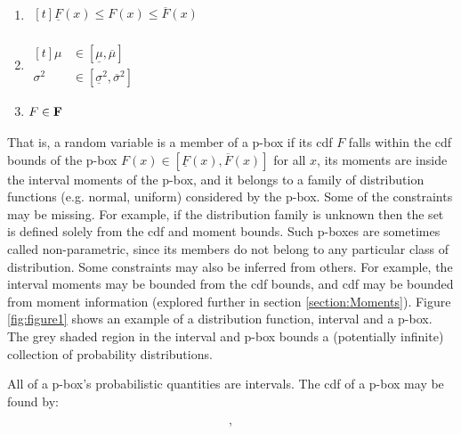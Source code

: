 \documentclass{juliacon}
\begin{document}
\begin{enumerate}
  \item $\begin{aligned}[t]
    \underline{F}(x) \leq F(x) \leq \overline{F}(x) \\%
  \end{aligned}$
  \item $\begin{aligned}[t]
    \mu &\in [\underline{ \mu }, \overline{ \mu }]  \\%
    \sigma^2 &\in [\underline{\sigma}^2 , \overline{\sigma}^2]
  \end{aligned}$
  \item $\begin{aligned}[t]
      F \in \bold{F} \\%
  \end{aligned}$
  \end{enumerate}

\noindent That is, a random variable is a member of a p-box if its cdf $F$ falls within the cdf bounds of the p-box $F(x) \in [\underline{F}(x), \overline{F}(x)]$ for all $x$, its moments are inside the interval moments of the p-box, and it belongs to a family of distribution functions (e.g. normal, uniform) considered by the p-box. Some of the constraints may be missing. For example, if the distribution family is unknown then the set is defined solely from the cdf and moment bounds. Such p-boxes are sometimes called non-parametric, since its members do not belong to any particular class of distribution. Some constraints may also be inferred from others. For example, the interval moments may be bounded from the cdf bounds, and cdf may be bounded from moment information (explored further in section \ref{section:Moments}). Figure \ref{fig:figure1} shows an example of a distribution function, interval and a p-box. The grey shaded region in the interval and p-box bounds a (potentially infinite) collection of probability distributions.

All of a p-box's probabilistic quantities are intervals. The cdf of a p-box may be found by: 

\begin{equation*}
  [\underline{F}(x), \overline{F}(x)] ,
\end{equation*}
\end{document}
